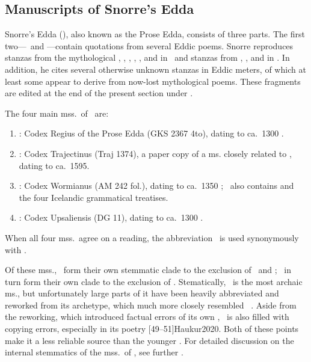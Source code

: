 \subsection{Manuscripts of Snorre’s Edda}

Snorre’s Edda (\SnorraEdda), also known as the Prose Edda, consists of three parts.  The first two---\Gylfaginning\ and \Skaldskaparmal---contain quotations from several Eddic poems.  Snorre reproduces stanzas from the mythological , , , , , and  in \Gylfaginning\ and stanzas from , , and  in \Skaldskaparmal.  In addition, he cites several otherwise unknown stanzas in Eddic meters, of which at least some appear to derive from now-lost mythological poems.  These fragments are edited at the end of the present section under .

The four main mss.~of \SnorraEdda\ are:%

\begin{enumerate}
  \item \RegiusProse: Codex Regius of the Prose Edda (GKS 2367 4to), dating to ca.~1300 \ce.
  \item \Trajectinus: Codex Trajectinus (Traj 1374), a paper copy of a ms. closely related to \RegiusProse, dating to ca.~1595.
  \item \Wormianus: Codex Wormianus (AM 242 fol.), dating to ca.~1350 \ce; \Wormianus\ also contains  and the four Icelandic grammatical treatises.
  \item \Upsaliensis: Codex Upsaliensis (DG 11), dating to ca.~1300 \ce.
\end{enumerate}

When all four mss.~agree on a reading, the abbreviation \GylfMS\ is used synonymously with \RegiusProse\Trajectinus\Wormianus\Upsaliensis.

Of these mss., \RegiusProse\Trajectinus\ form their own stemmatic clade to the exclusion of \Wormianus\ and \Upsaliensis; \RegiusProse\Trajectinus\Wormianus\ in turn form their own clade to the exclusion of \Upsaliensis.
Stematically, \Upsaliensis\ is the most archaic ms., but unfortunately large parts of it have been heavily abbreviated and reworked from its archetype, which much more closely resembled \RegiusProse\Trajectinus\Wormianus\ \parencites{Sävborg2012}{Sävborg2013}.
Aside from the reworking, which introduced factual errors of its own \parencite[265]{Sävborg2013}, \Upsaliensis\ is also filled with copying errors, especially in its poetry \parencite[193--194]{Males2023Textual}[49--51]{Haukur2020}.  Both of these points make it a less reliable source than the younger \Regius\Trajectinus\Wormianus.
For detailed discussion on the internal stemmatics of the mss.~of \SnorraEdda, see further \textcite{Haukur2017}.

